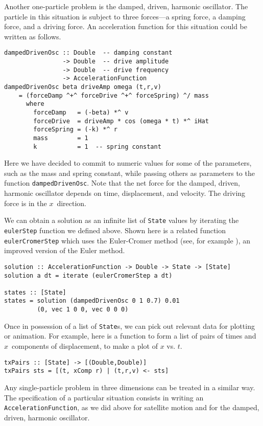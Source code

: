 \documentclass[11pt]{article}
\begin{document}
Another one-particle problem is the damped, driven, harmonic oscillator.
The particle in this situation is subject to three forces---a spring force,
a damping force, and a driving force.
An acceleration function for this situation could be written as follows.
\begin{verbatim}
dampedDrivenOsc :: Double  -- damping constant
                -> Double  -- drive amplitude
                -> Double  -- drive frequency
                -> AccelerationFunction
dampedDrivenOsc beta driveAmp omega (t,r,v)
    = (forceDamp ^+^ forceDrive ^+^ forceSpring) ^/ mass
      where
        forceDamp   = (-beta) *^ v
        forceDrive  = driveAmp * cos (omega * t) *^ iHat
        forceSpring = (-k) *^ r
        mass        = 1
        k           = 1  -- spring constant
\end{verbatim}
Here we have decided to commit to numeric values for some of the parameters, such
as the mass and spring constant, while passing others as parameters
to the function \verb|dampedDrivenOsc|.
Note that the net force for the damped, driven, harmonic oscillator
depends on time, displacement, and velocity.  The driving force is
in the $x$~direction.

We can obtain a solution as an infinite list of \verb|State| values by iterating
the \verb|eulerStep| function we defined above.  Shown here is a related function
\verb|eulerCromerStep| which uses the Euler-Cromer method
(see, for example \cite{giordano97}), an improved
version of the Euler method.

\begin{verbatim}
solution :: AccelerationFunction -> Double -> State -> [State]
solution a dt = iterate (eulerCromerStep a dt)

states :: [State]
states = solution (dampedDrivenOsc 0 1 0.7) 0.01
         (0, vec 1 0 0, vec 0 0 0)
\end{verbatim}

Once in possession of a list of \verb|State|s,
we can pick out relevant data for plotting or animation.
For example, here is a function to form a list of pairs of times and $x$~components
of displacement, to make a plot of $x$ vs. $t$.
\begin{verbatim}
txPairs :: [State] -> [(Double,Double)]
txPairs sts = [(t, xComp r) | (t,r,v) <- sts]
\end{verbatim}

Any single-particle problem in three dimensions can be treated in a similar
way.  The specification of a particular situation consists in writing
an \verb|AccelerationFunction|, as we did above for
satellite motion and for the damped, driven, harmonic oscillator.
\end{document}
